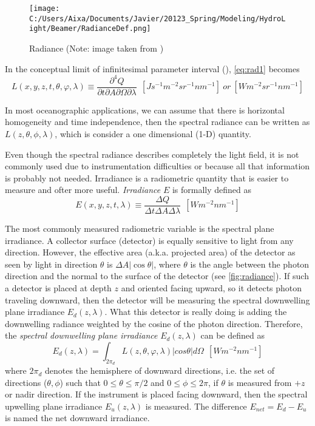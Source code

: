 \begin{figure}[htb]
  \centering
  \texttt{[image: C:/Users/Aixa/Documents/Javier/20123\_Spring/Modeling/HydroLight/Beamer/RadianceDef.png]}
\caption{Radiance (Note: image taken from \cite{Mobley:2001})}
\label{fig:radiance} 
\end{figure}

In the conceptual limit of infinitesimal parameter interval (\cite{Mobley:2001}), \autoref{eq:rad1} becomes
\begin{equation}
  L(x,y,z,t,\theta,\varphi,\lambda)\equiv\frac{\partial^4 Q}{\partial t\partial A\partial\Omega\partial\lambda}~~\left[ Js^{-1}m^{-2}sr^{-1}nm^{-1} \right]~or~\left[ W m^{-2}sr^{-1}nm^{-1} \right]
\end{equation}

In most oceanographic applications, we can assume that there is horizontal homogeneity and time independence, then the spectral radiance can be written as $L(z,\theta,\phi,\lambda)$, which is consider a one dimensional (1-D) quantity.

Even though the spectral radiance describes completely the light field, it is not commonly used due to instrumentation difficulties or because all that information is probably not needed. Irradiance is a radiometric quantity that is easier to measure and ofter more useful. {\it Irradiance} $E$ is formally defined as
\begin{equation}
  E(x,y,z,t,\lambda) \equiv \frac{\Delta Q}{\Delta t\Delta A\Delta\lambda}~~\left[ W m^{-2}nm^{-1} \right]
\end{equation}

The most commonly measured radiometric variable is the spectral plane irradiance. A collector surface (detector) is equally sensitive to light from any direction. However, the effective area (a.k.a. projected area) of the detector as seen by light in direction $\theta$ is $\Delta A|\cos{\theta}|$, where $\theta$ is the angle between the photon direction and the normal to the surface of the detector (see \autoref{fig:radiance}). If such a detector is placed at depth $z$ and oriented facing upward, so it detects photon traveling downward, then the detector will be measuring the spectral downwelling plane irradiance $E_d(z,\lambda)$. What this detector is really doing is adding the downwelling radiance weighted by the cosine of the photon direction. Therefore, the {\it spectral downwelling plane irradiance} $E_d(z,\lambda)$ can be defined as
\begin{equation}
  E_{d}(z,\lambda)=\int_{2\pi_d} L(z,\theta,\varphi,\lambda)|cos\theta|d\Omega~~\left[Wm^{-2}nm^{-1} \right]
\end{equation}
where $2\pi_d$ denotes the hemisphere of downward directions, i.e. the set of directions ($\theta,\phi$) such that $0\leq\theta\leq\pi/2$ and $0\leq\phi\leq2\pi$, if $\theta$ is measured from $+z$ or nadir direction. If the instrument is placed facing downward, then the spectral upwelling plane irradiance $E_u(z,\lambda)$ is measured. The difference $E_{net}=E_d-E_u$ is named the net downward irradiance.

